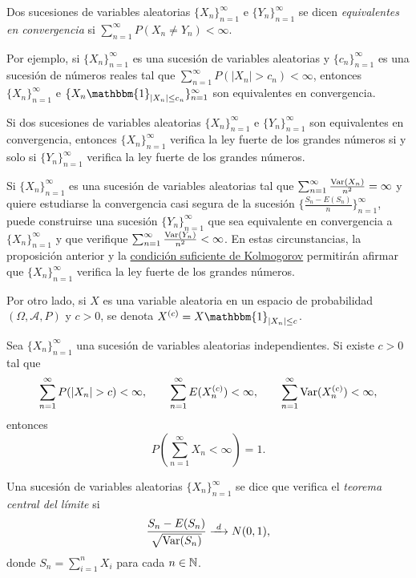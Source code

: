 \documentclass[a4paper, 11pt, extrafontsizes]{memoir}
\begin{document}
\begin{definition}
    Dos sucesiones de variables aleatorias $\{X_n\}_{n=1}^\infty$ e $\{Y_n\}_{n=1}^\infty$ se dicen \emph{equivalentes en convergencia} si $\sum_{n=1}^\infty P(X_n \neq Y_n) < \infty$.
\end{definition}

Por ejemplo, si $\{X_n\}_{n=1}^\infty$ es una sucesión de variables aleatorias y $\{c_n\}_{n=1}^\infty$ es una sucesión de números reales tal que $\sum_{n=1}^\infty P(|X_n| > c_n) < \infty$,
entonces $\{X_n\}_{n=1}^\infty$ e $\{X_n\mathbbm{1}_{|X_n| \leq c_n}\}_{n=1}^\infty$ son equivalentes en convergencia.

\begin{proposition}
    Si dos sucesiones de variables aleatorias $\{X_n\}_{n=1}^\infty$ e $\{Y_n\}_{n=1}^\infty$ son equivalentes en convergencia, entonces $\{X_n\}_{n=1}^\infty$ verifica la ley fuerte de los grandes números si y solo si $\{Y_n\}_{n=1}^\infty$ verifica la ley fuerte de los grandes números.
\end{proposition}

Si $\{X_n\}_{n=1}^\infty$ es una sucesión de variables aleatorias tal que $\sum_{n=1}^\infty \frac{\textup{Var}(X_n)}{n^2} = \infty$ y quiere estudiarse la convergencia casi segura de la sucesión $\{\frac{S_n-E(S_n)}{n}\}_{n=1}^\infty$, puede construirse una sucesión $\{Y_n\}_{n=1}^\infty$ que sea equivalente en convergencia a $\{X_n\}_{n=1}^\infty$ y que verifique $\sum_{n=1}^\infty \frac{\textup{Var}(Y_n)}{n^2} < \infty$. En estas circunstancias, la proposición anterior y la \hyperref[teo:4.6.9]{\color{gray}condición suficiente de Kolmogorov} permitirán afirmar que $\{X_n\}_{n=1}^\infty$ verifica la ley fuerte de los grandes números.

Por otro lado, si $X$ es una variable aleatoria en un espacio de probabilidad $(\Omega,\mathcal{A},P)$ y $c > 0$, se denota $X^{(c)} = X\mathbbm{1}_{|X_n| \leq c}$.

\begin{theorem}
    Sea $\{X_n\}_{n=1}^\infty$ una sucesión de variables aleatorias independientes. Si existe $c > 0$ tal que
    \[\sum_{n=1}^\infty P(|X_n| > c) < \infty, \qquad \sum_{n=1}^\infty E(X_n^{(c)}) < \infty, \qquad \sum_{n=1}^\infty \textup{Var}(X_n^{(c)}) < \infty,\]
    entonces
    \[P\left(\sum_{n=1}^\infty X_n < \infty\right) = 1.\]
\end{theorem}

\begin{definition}
    Una sucesión de variables aleatorias $\{X_n\}_{n=1}^\infty$ se dice que verifica el \emph{teorema central del límite} si
    \[\frac{S_n-E(S_n)}{\sqrt{\Var{S_n}}} \dconv N(0,1),\]
    donde $S_n = \sum_{i=1}^n X_i$ para cada $n \in \mathbb N$.
\end{definition}
\end{document}
